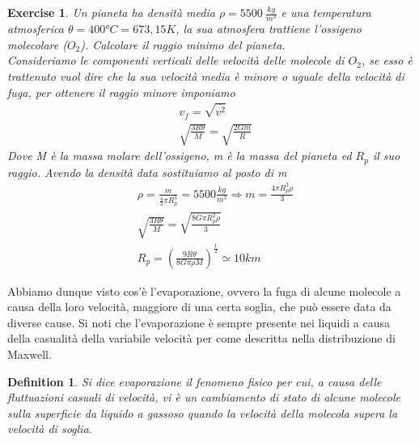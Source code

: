 \documentclass[10pt,a4paper]{article}
\newtheorem{exercise}{Exercise}
\newtheorem{definition}{Definition}
\begin{document}
\begin{exercise}
 Un pianeta ha densità media $\rho = 5500\ \frac{kg}{m^3}$ e una temperatura atmosferica $\theta = 400 °C = 673,15 K$, la sua atmosfera trattiene l'ossigeno molecolare ($O_2$). Calcolare il raggio minimo del pianeta.\\
 Consideriamo le componenti verticali delle velocità delle molecole di $O_2$, se esso è trattenuto vuol dire che la sua velocità media è minore o uguale della velocità di fuga, per ottenere il raggio minore imponiamo 
 \begin{align*} 
	&v_f = \sqrt{\overline{v^2}}\\
	&\sqrt{\frac{3 R \theta}{M}} = \sqrt{\frac{2 G m}{R}}
 \end{align*} 
Dove M è la massa molare dell'ossigeno, m è la massa del pianeta ed $R_p$ il suo raggio. Avendo la densità data sostituiamo al posto di m 
\begin{align*} 
	&\rho = \frac{m}{\frac{4}{3}\pi R_p^3}=5500 \frac{kg}{m^3} \Rightarrow m = \frac{4 \pi R_p^3 \rho}{3}\\
	&\sqrt{\frac{3 R\theta}{M}} = \sqrt{\frac{8 G \pi R_p^2 \rho}{3}}\\
	& R_p = \left(\frac{9 R \theta}{8G\pi \rho M}\right)^{\frac{1}{2}}\simeq 10 km
\end{align*} 
\end{exercise}
Abbiamo dunque visto cos'è l'evaporazione, ovvero la fuga di alcune molecole a causa della loro velocità, maggiore di una certa soglia, che può essere data da diverse cause. Si noti che l'evaporazione è sempre presente nei liquidi a causa della casualità della variabile velocità per come descritta nella distribuzione di Maxwell.
\begin{definition}
Si dice evaporazione il fenomeno fisico per cui, a causa delle fluttuazioni casuali di velocità, vi è un cambiamento di stato di alcune molecole sulla superficie da liquido a gassoso quando la velocità della molecola supera la velocità di soglia. 
\end{definition}
\end{document}
